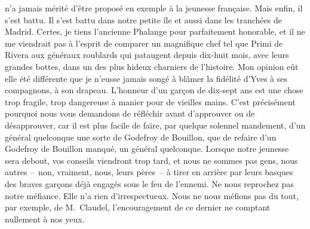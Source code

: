 \documentclass[french,twoside]{book} %
\newcommand{\astertri}{\medskip\par\centerline{\color{rubric}\large\selectfont{\syms ✻\,✻\,✻}}\medskip\par}%
\begin{document}
n’a jamais mérité d’être proposé en exemple à la jeunesse française. Mais enfin, il s’est battu. Il s’est battu dans notre petite île et aussi dans les tranchées de Madrid. Certes, je tiens l’ancienne Phalange pour parfaitement honorable, et il ne me viendrait pas à l’esprit de comparer un magnifique chef tel que Primi de Rivera aux généraux roublards qui pataugent depuis dix-huit mois, avec leurs grandes bottes, dans un des plus hideux charniers de l’histoire. Mon opinion eût elle été différente que je n’eusse jamais songé à blâmer la fidélité d’Yves à ses compagnons, à son drapeau. L’honneur d’un garçon de dix-sept ans est une chose trop fragile, trop dangereuse à manier pour de vieilles mains. C’est précisément pourquoi nous vous demandons de réfléchir avant d’approuver ou de désapprouver, car il est plus facile de faire, par quelque solennel mandement, d’un général quelconque une sorte de Godefroy de Bouillon, que de refaire d’un Godefroy de Bouillon manqué, un général quelconque. Lorsque notre jeunesse sera debout, vos conseils viendront trop tard, et nous ne sommes pas gens, nous autres – non, vraiment, nous, leurs pères – à tirer en arrière par leurs basques des braves garçons déjà engagés sous le feu de l’ennemi. Ne nous reprochez pas notre méfiance. Elle n’a rien d’irrespectueux. Nous ne nous méfions pas du tout, par exemple, de M. Claudel, l’encouragement de ce dernier ne comptant nullement à nos yeux.\par
 \par

\astertri
\end{document}
